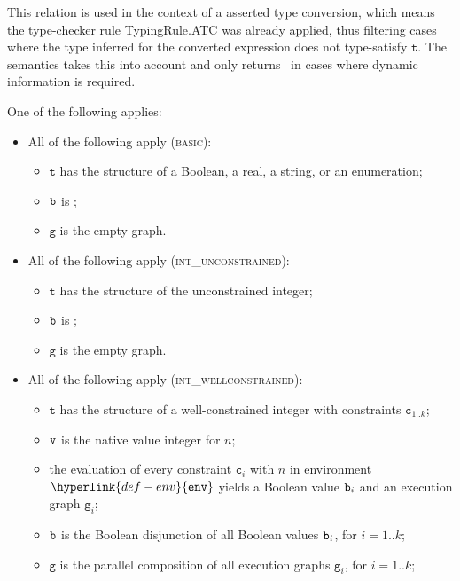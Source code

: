 \documentclass{book}
\newcommand\ErrorConfig[0]{\hyperlink{def-errorconfig}{\texttt{\#DE}}}
\newcommand\ProseOrError[0]{\ProseTerminateAs{\ErrorConfig}}
\newcommand\env[0]{\hyperlink{def-env}{\texttt{env}}}
\newcommand\vc[0]{\texttt{c}}
\newcommand\vg[0]{\texttt{g}}
\newcommand\vt[0]{\texttt{t}}
\begin{document}
This relation is used in the context of a asserted type conversion,
which means the type-checker rule TypingRule.ATC was already applied,
thus filtering cases where the type inferred for the converted expression
does not type-satisfy $\vt$. The semantics takes this into account and
only returns \False\ in cases where dynamic information is required.

One of the following applies:
\begin{itemize}
  \item All of the following apply (\textsc{basic}):
  \begin{itemize}
    \item $\vt$ has the structure of a Boolean, a real, a string, or an enumeration;
    \item $\texttt{b}$ is \True;
    \item $\vg$ is the empty graph.
  \end{itemize}

  \item All of the following apply (\textsc{int\_unconstrained}):
  \begin{itemize}
    \item $\vt$ has the structure of the unconstrained integer;
    \item $\texttt{b}$ is \True;
    \item $\vg$ is the empty graph.
  \end{itemize}

  \item All of the following apply (\textsc{int\_wellconstrained}):
  \begin{itemize}
    \item $\vt$ has the structure of a well-constrained integer with constraints $\vc_{1..k}$;
    \item $\texttt{v}$ is the native value integer for $n$;
    \item the evaluation of every constraint $\vc_i$ with $n$ in environment $\env$
    yields a Boolean value $\texttt{b}_i$ and an execution graph $\vg_i$\ProseOrError;
    \item $\texttt{b}$ is the Boolean disjunction of all Boolean values $\texttt{b}_i$, for $i=1..k$;
    \item $\vg$ is the parallel composition of all execution graphs $\vg_i$, for $i=1..k$;
  \end{itemize}


\end{itemize}
\end{document}
